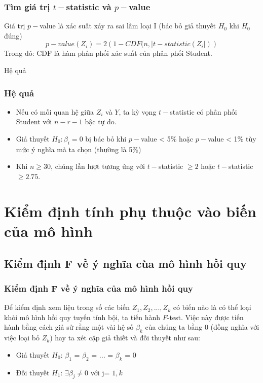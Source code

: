 \begin{footnotesize}
\begin{frame}
\end{frame}
\begin{frame}
\frametitle{Tìm giá trị $t-$statistic và $p-$value}
Giá trị $p-$value là xác suất xảy ra sai lầm loại I (bác bỏ giả thuyết $H_0$ khi $H_0$ đúng)
\[
p-value \left(Z_i\right) = 2 \left(1-CDF(n,|t-statistic(Z_i|)\right)
\]
Trong đó: CDF là hàm phân phối xác suất của phân phối Student.
\end{frame}
\begin{frame}
\begin{block}{Hệ quả}
\frametitle{Hệ quả}
\begin{itemize}
\item Nếu có mối quan hệ giữa $Z_i$ và $Y$, ta kỳ vọng $t-$statistic có phân phối Student với $n-r-1$ bậc tự do.
\item Giả thuyết $H_0: \beta_i = 0$ bị bác bỏ khi $p-$value < 5\% hoặc $p-$value < 1\% tùy mức ý nghĩa mà ta chọn (thường là 5\%)
\item Khi $ n \ge 30$, chúng lần lượt tương ứng với $t-$statistic $\ge 2$ hoặc $t-$statistic $\ge 2.75$.
\end{itemize}
\end{block}
\end{frame}
\section{Kiểm định tính phụ thuộc vào biến của mô hình}
\subsection{Kiểm định F về ý nghĩa cùa mô hình hồi quy}
\begin{frame}
\frametitle{Kiểm định F về ý nghĩa của mô hình hồi quy}
Để kiểm định xem liệu trong số các biến $Z_1,Z_2,...,Z_k$ có biến nào là có thể loại khỏi mô hình hồi quy tuyến tính bội, ta tiến hành $F$-test. Việc này được tiến hành bằng cách giả sử rằng một vài hệ số $\beta_k$ của chúng ta bằng 0 (đồng nghĩa với việc loại bỏ $Z_k$) hay ta xét cặp giả thiết và đối thuyết như sau:
\begin{itemize}
    \item Giả thuyết $H_0$: $\beta_1$ =  $\beta_2$ = ... =  $\beta_k$ = 0
    \item Đối thuyết $H_1$: $\exists\beta_j \neq 0$ với j= $\overline{1,k}$ 
\end{itemize}


\end{frame}
\end{footnotesize}
